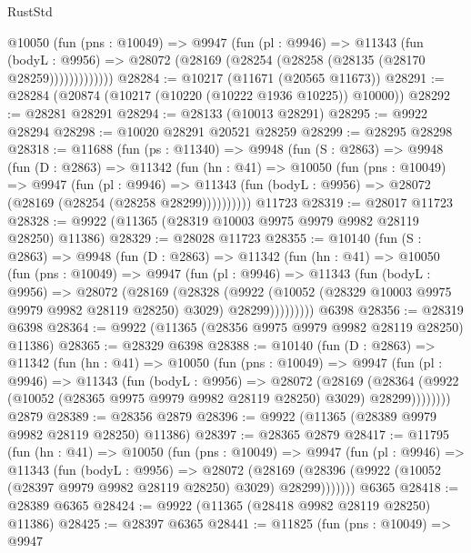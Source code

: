 \begin{lexlean}{RustStd}
\begin{coremodule}
            @10050
              (fun (pns : @10049) =>
              @9947
                (fun (pl : @9946) =>
                @11343
                  (fun (bodyL : @9956) =>
                  @28072 (@28169 (@28254 (@28258 (@28135 (@28170 @28259)))))))))))))
@28284 := @10217 (@11671 (@20565 @11673))
@28291 := @28284 (@20874 (@10217 (@10220 (@10222 @1936 @10225)) @10000))
@28292 := @28281 @28291
@28294 := @28133 (@10013 @28291)
@28295 := @9922 @28294
@28298 := @10020 @28291 @20521 @28259
@28299 := @28295 @28298
@28318 := @11688
    (fun (ps : @11340) =>
    @9948
      (fun (S : @2863) =>
      @9948
        (fun (D : @2863) =>
        @11342
          (fun (hn : @41) =>
          @10050
            (fun (pns : @10049) =>
            @9947
              (fun (pl : @9946) =>
              @11343 (fun (bodyL : @9956) => @28072 (@28169 (@28254 (@28258 @28299))))))))))
    @11723
@28319 := @28017 @11723
@28328 := @9922 (@11365 (@28319 @10003 @9975 @9979 @9982 @28119 @28250) @11386)
@28329 := @28028 @11723
@28355 := @10140
    (fun (S : @2863) =>
    @9948
      (fun (D : @2863) =>
      @11342
        (fun (hn : @41) =>
        @10050
          (fun (pns : @10049) =>
          @9947
            (fun (pl : @9946) =>
            @11343
              (fun (bodyL : @9956) =>
              @28072
                (@28169
                  (@28328
                    (@9922
                      (@10052 (@28329 @10003 @9975 @9979 @9982 @28119 @28250) @3029)
                      @28299)))))))))
    @6398
@28356 := @28319 @6398
@28364 := @9922 (@11365 (@28356 @9975 @9979 @9982 @28119 @28250) @11386)
@28365 := @28329 @6398
@28388 := @10140
    (fun (D : @2863) =>
    @11342
      (fun (hn : @41) =>
      @10050
        (fun (pns : @10049) =>
        @9947
          (fun (pl : @9946) =>
          @11343
            (fun (bodyL : @9956) =>
            @28072
              (@28169
                (@28364
                  (@9922 (@10052 (@28365 @9975 @9979 @9982 @28119 @28250) @3029) @28299))))))))
    @2879
@28389 := @28356 @2879
@28396 := @9922 (@11365 (@28389 @9979 @9982 @28119 @28250) @11386)
@28397 := @28365 @2879
@28417 := @11795
    (fun (hn : @41) =>
    @10050
      (fun (pns : @10049) =>
      @9947
        (fun (pl : @9946) =>
        @11343
          (fun (bodyL : @9956) =>
          @28072
            (@28169 (@28396 (@9922 (@10052 (@28397 @9979 @9982 @28119 @28250) @3029) @28299)))))))
    @6365
@28418 := @28389 @6365
@28424 := @9922 (@11365 (@28418 @9982 @28119 @28250) @11386)
@28425 := @28397 @6365
@28441 := @11825
    (fun (pns : @10049) =>
    @9947

\end{coremodule}
\end{lexlean}
